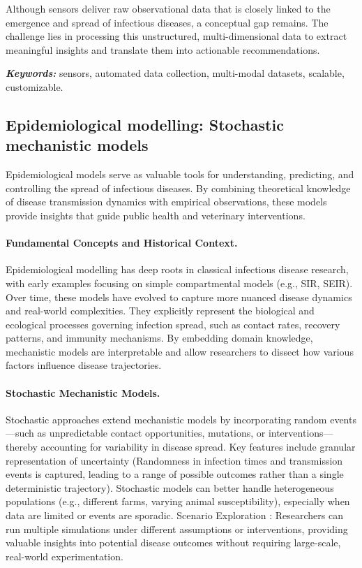 Although sensors deliver raw observational data that is closely linked to the emergence and spread of infectious diseases, a conceptual gap remains. The challenge lies in processing this unstructured, multi-dimensional data to extract meaningful insights and translate them into actionable recommendations.

\textit{\textbf{Keywords:}} sensors, automated data collection, multi-modal datasets, scalable, customizable.


\subsection{Epidemiological modelling: Stochastic mechanistic models}

Epidemiological models serve as valuable tools for understanding, predicting, and controlling the spread of infectious diseases. By combining theoretical knowledge of disease transmission dynamics with empirical observations, these models provide insights that guide public health and veterinary interventions.

\paragraph{Fundamental Concepts and Historical Context.} Epidemiological modelling has deep roots in classical infectious disease research, with early examples focusing on simple compartmental models (e.g., SIR, SEIR). Over time, these models have evolved to capture more nuanced disease dynamics and real-world complexities. They explicitly represent the biological and ecological processes governing infection spread, such as contact rates, recovery patterns, and immunity mechanisms. By embedding domain knowledge, mechanistic models are interpretable and allow researchers to dissect how various factors influence disease trajectories.

\paragraph{Stochastic Mechanistic Models.} Stochastic approaches extend mechanistic models by incorporating random events—such as unpredictable contact opportunities, mutations, or interventions—thereby accounting for variability in disease spread. Key features include granular representation of uncertainty (Randomness in infection times and transmission events is captured, leading to a range of possible outcomes rather than a single deterministic trajectory). Stochastic models can better handle heterogeneous populations (e.g., different farms, varying animal susceptibility), especially when data are limited or events are sporadic. Scenario Exploration : Researchers can run multiple simulations under different assumptions or interventions, providing valuable insights into potential disease outcomes without requiring large-scale, real-world experimentation.

